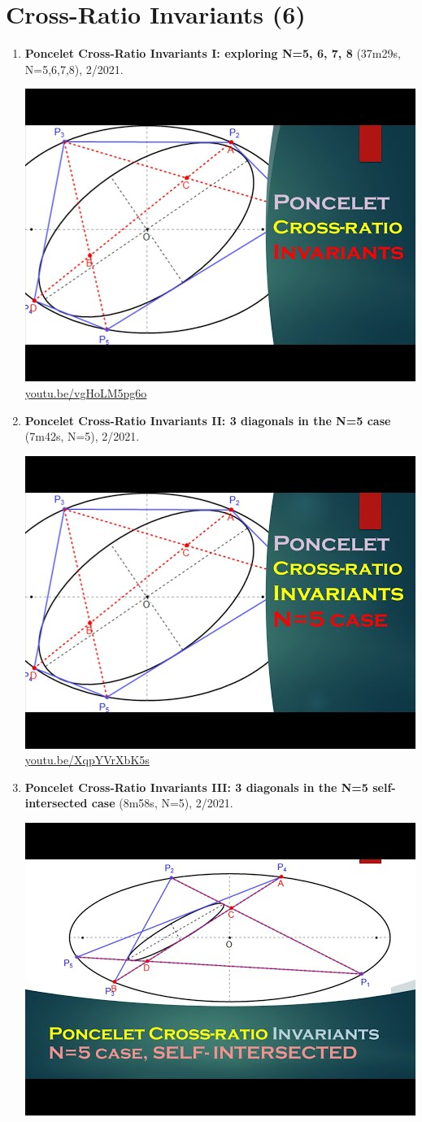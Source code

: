 \documentclass[12pt]{amsart}
\begin{document}
\section{Cross-Ratio Invariants (6)}

\begin{enumerate}[resume]
\item \textbf{Poncelet Cross-Ratio Invariants I: exploring N=5, 6, 7, 8} (37m29s, N=5,6,7,8), 2/2021. 
\begin{center}\includegraphics[width=.5\textwidth]{pics/vgHoLM5pg6o.jpg} \\ 
\href{https://youtu.be/vgHoLM5pg6o}{\url{youtu.be/vgHoLM5pg6o}}\end{center}
% 
\item \textbf{Poncelet Cross-Ratio Invariants II: 3 diagonals in the N=5 case} (7m42s, N=5), 2/2021. 
\begin{center}\includegraphics[width=.5\textwidth]{pics/XqpYVrXbK5s.jpg} \\ 
\href{https://youtu.be/XqpYVrXbK5s}{\url{youtu.be/XqpYVrXbK5s}}\end{center}
% 
\item \textbf{Poncelet Cross-Ratio Invariants III: 3 diagonals in the N=5 self-intersected case} (8m58s, N=5), 2/2021. 
\begin{center}\includegraphics[width=.5\textwidth]{pics/4bd0YhQZMPM.jpg} \\ 

\end{center}
\end{enumerate}
\end{document}
